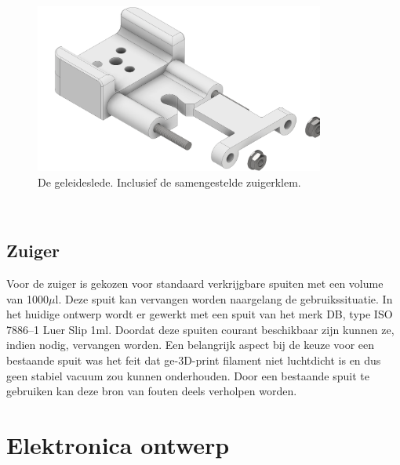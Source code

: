 \begin{minipage}[t]{0.59\textwidth}
    \vspace{0pt}
    \begin{figure}[H]
        \centering
        \includegraphics[width=0.85\textwidth]{figures/CarriageAndClamp.png}
        \caption{De geleideslede. Inclusief de samengestelde zuigerklem.}\label{fig:CarriageAndClamp}
    \end{figure}
\end{minipage}\\

\subsection{Zuiger}
Voor de zuiger is gekozen voor standaard verkrijgbare spuiten met een volume van 1000$\mu$l. Deze spuit kan vervangen worden naargelang de gebruikssituatie. In het huidige ontwerp wordt er gewerkt met een spuit van het merk DB, type ISO 7886--1 Luer Slip 1ml. Doordat deze spuiten courant beschikbaar zijn kunnen ze, indien nodig, vervangen worden.
Een belangrijk aspect bij de keuze voor een bestaande spuit was het feit dat ge-3D-print filament niet luchtdicht is en dus geen stabiel vacuum zou kunnen onderhouden. Door een bestaande spuit te gebruiken kan deze bron van fouten deels verholpen worden.

\section{Elektronica ontwerp}
